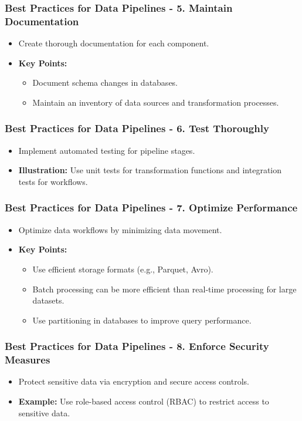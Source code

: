 \documentclass[aspectratio=169]{beamer}
\begin{document}
\begin{frame}[fragile]
    \frametitle{Best Practices for Data Pipelines - 5. Maintain Documentation}
    \begin{itemize}
        \item Create thorough documentation for each component.
        \item \textbf{Key Points:}
        \begin{itemize}
            \item Document schema changes in databases.
            \item Maintain an inventory of data sources and transformation processes.
        \end{itemize}
    \end{itemize}
\end{frame}

\begin{frame}[fragile]
    \frametitle{Best Practices for Data Pipelines - 6. Test Thoroughly}
    \begin{itemize}
        \item Implement automated testing for pipeline stages.
        \item \textbf{Illustration:} Use unit tests for transformation functions and integration tests for workflows.
    \end{itemize}
\end{frame}

\begin{frame}[fragile]
    \frametitle{Best Practices for Data Pipelines - 7. Optimize Performance}
    \begin{itemize}
        \item Optimize data workflows by minimizing data movement.
        \item \textbf{Key Points:}
        \begin{itemize}
            \item Use efficient storage formats (e.g., Parquet, Avro).
            \item Batch processing can be more efficient than real-time processing for large datasets.
            \item Use partitioning in databases to improve query performance.
        \end{itemize}
    \end{itemize}
\end{frame}

\begin{frame}[fragile]
    \frametitle{Best Practices for Data Pipelines - 8. Enforce Security Measures}
    \begin{itemize}
        \item Protect sensitive data via encryption and secure access controls.
        \item \textbf{Example:} Use role-based access control (RBAC) to restrict access to sensitive data.
    \end{itemize}
\end{frame}
\end{document}
